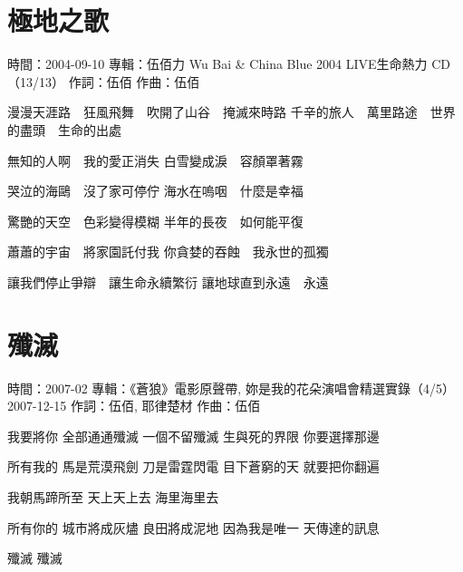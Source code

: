 \documentclass[UTF8,a4paper,oneside,twocolumn,12pt]{ctexbook}
\newcommand{\infopair}[2]{\textbullet #1：#2}
\newcommand{\zc}[1][伍佰]{\infopair{作詞}{#1}}
\newcommand{\zq}[1][伍佰]{\infopair{作曲}{#1}}
\newcommand{\zj}[1]{\infopair{專輯}{#1}}
\newcommand{\sj}[1]{\infopair{時間}{#1}}
\newenvironment{info}{\begin{flushleft}\kaishu
	}
	{\end{flushleft}\normalsize\yahei\par}
\newenvironment{lyric}{
	}
{}
\begin{document}
\section{極地之歌}
\begin{info}
	\sj{2004-09-10}
	\zj{伍佰力 Wu Bai \& China Blue 2004 LIVE生命熱力 CD（13/13）}
	\zc
	\zq
\end{info}
\begin{lyric}
	漫漫天涯路　狂風飛舞　吹開了山谷　掩滅來時路
	千辛的旅人　萬里路途　世界的盡頭　生命的出處

	無知的人啊　我的愛正消失
	白雪變成淚　容顏罩著霧

	哭泣的海鷗　沒了家可停佇
	海水在嗚咽　什麼是幸福

	驚艷的天空　色彩變得模糊
	半年的長夜　如何能平復

	蕭蕭的宇宙　將家園託付我
	你貪婪的吞蝕　我永世的孤獨

	讓我們停止爭辯　讓生命永續繁衍
	讓地球直到永遠　永遠
\end{lyric}

\section{殲滅}
\begin{info}
	\sj{2007-02}
	\zj{《蒼狼》電影原聲帶, 妳是我的花朵演唱會精選實錄（4/5） 2007-12-15}
	\zc[伍佰, 耶律楚材]
	\zq
\end{info}
\begin{lyric}
	我要將你
	全部通通殲滅
	一個不留殲滅
	生與死的界限
	你要選擇那邊

	所有我的
	馬是荒漠飛劍
	刀是雷霆閃電
	目下蒼窮的天
	就要把你翻遍

	我朝馬蹄所至 天上天上去 海里海里去

	所有你的
	城市將成灰燼
	良田將成泥地
	因為我是唯一
	天傳達的訊息

	殲滅 殲滅
\end{lyric}
\end{document}
